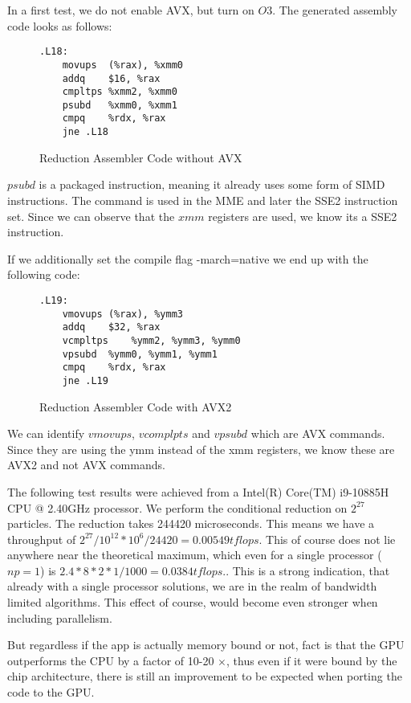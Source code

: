 \documentclass[]{article}
\begin{document}
In a first test, we do not enable AVX, but turn on $O3$. The generated assembly code looks as follows:

\begin{figure}[H]
	\begin{lstlisting}
.L18:
	movups	(%rax), %xmm0
	addq	$16, %rax
	cmpltps	%xmm2, %xmm0
	psubd	%xmm0, %xmm1
	cmpq	%rdx, %rax
	jne	.L18

	\end{lstlisting}
\caption{Reduction Assembler Code without AVX}
\label{fig:assembler}
\end{figure}
$psubd$ is a packaged instruction, meaning it already uses some form of SIMD instructions. The command is used in the MME and later the SSE2 instruction set. Since we can observe that the $xmm$ registers are used, we know its a SSE2 instruction. 

If we additionally set the compile flag -march=native we end up with the following code:

\begin{figure}[H]
\begin{lstlisting}
.L19:
	vmovups	(%rax), %ymm3
	addq	$32, %rax
	vcmpltps	%ymm2, %ymm3, %ymm0
	vpsubd	%ymm0, %ymm1, %ymm1
	cmpq	%rdx, %rax
	jne	.L19	

\end{lstlisting}
\caption{Reduction Assembler Code with AVX2}
\label{fig:assembler-avx}
\end{figure}

We can identify $vmovups$, $vcomplpts$ and $vpsubd$ which are AVX commands. Since they are using the ymm instead of the xmm registers, we know these are AVX2 and not AVX commands.

The following test results were achieved from a Intel(R) Core(TM) i9-10885H CPU @ 2.40GHz
processor. We perform the conditional reduction on  $2^{27}$ particles. The reduction takes 244420 microseconds. This means we have a throughput of $2^{27} / 10^{12} * 10^6 / 24420 = 0.00549 tflops$. This of course does not lie anywhere near the theoretical maximum, which even for a single processor ($np = 1$) is $2.4 * 8 * 2 * 1 / 1000 = 0.0384 tflops.$. This is a strong indication, that already with a single processor solutions, we are in the realm of bandwidth limited algorithms. This effect of course, would become even stronger when including parallelism.

But regardless if the app is actually memory bound or not, fact is that the GPU outperforms the CPU by a factor of 10-20 $\times$, thus even if it were bound by the chip architecture, there is still an improvement to be expected when porting the code to the GPU. 
\end{document}
